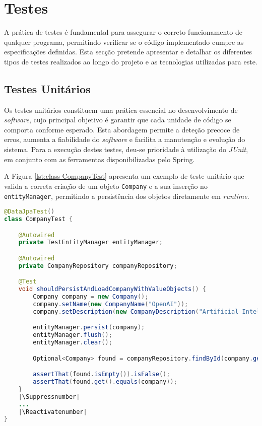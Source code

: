 \section{Testes}

A prática de testes é fundamental para assegurar o correto funcionamento de qualquer programa, permitindo verificar se o código implementado cumpre as especificações definidas. Esta secção pretende apresentar e detalhar os diferentes tipos de testes realizados ao longo do projeto e as tecnologias utilizadas para este.

\subsection{Testes Unitários}

Os testes unitários constituem uma prática essencial no desenvolvimento de \textit{software}, cujo principal objetivo é garantir que cada unidade de código se comporta conforme esperado. Esta abordagem permite a deteção precoce de erros, aumenta a fiabilidade do \textit{software} e facilita a manutenção e evolução do sistema. Para a execução destes testes, deu-se prioridade à utilização do \textit{JUnit}, em conjunto com as ferramentas disponibilizadas pelo \gls{Spring}.

A Figura \ref{lst:class-CompanyTest} apresenta um exemplo de teste unitário que valida a correta criação de um objeto \lstinline|Company| e a sua inserção no \lstinline|entityManager|, permitindo a persistência dos objetos diretamente em \textit{runtime}.

\begin{lstlisting}[language=Java, label={lst:class-CompanyTest}, caption={Class \textit{CompanyTest} - Exemplificação de testes Unitários}]
@DataJpaTest()
class CompanyTest {

    @Autowired
    private TestEntityManager entityManager;

    @Autowired
    private CompanyRepository companyRepository;

    @Test
    void shouldPersistAndLoadCompanyWithValueObjects() {
        Company company = new Company();
        company.setName(new CompanyName("OpenAI"));
        company.setDescription(new CompanyDescription("Artificial Intelligence Research"));

        entityManager.persist(company);
        entityManager.flush();
        entityManager.clear();

        Optional<Company> found = companyRepository.findById(company.getIid());

        assertThat(found.isEmpty()).isFalse();
        assertThat(found.get().equals(company));
    }
    |\Suppressnumber|
    ...
    |\Reactivatenumber|
}
\end{lstlisting}

